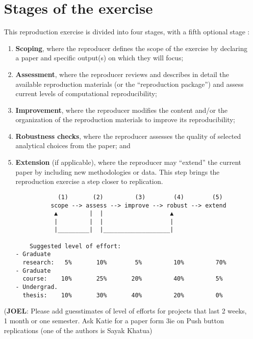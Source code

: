 \documentclass[]{book}
\begin{document}
\hypertarget{stages-of-the-exercise}{%
\section{Stages of the exercise}\label{stages-of-the-exercise}}

This reproduction exercise is divided into four stages, with a fifth optional stage :

\begin{enumerate}
\def\labelenumi{\arabic{enumi}.}
\item
  \textbf{Scoping}, where the reproducer defines the scope of the exercise by declaring a paper and specific output(s) on which they will focus;\\
\item
  \textbf{Assessment}, where the reproducer reviews and describes in detail the available reproduction materials (or the ``reproduction package'') and assess current levels of computational reproducibility;\\
\item
  \textbf{Improvement}, where the reproducer modifies the content and/or the organization of the reproduction materials to improve its reproducibility;\\
\item
  \textbf{Robustness checks}, where the reproducer assesses the quality of selected analytical choices from the paper; and\\
\item
  \textbf{Extension} (if applicable), where the reproducer may ``extend'' the current paper by including new methodologies or data. This step brings the reproduction exercise a step closer to replication.

\begin{verbatim}
            (1)       (2)         (3)        (4)        (5)
          scope --> assess --> improve --> robust --> extend
           ▲         |  |                   ▲
           |         |  |                   |
           |_________|  |___________________|

    Suggested level of effort:
- Graduate
  research:   5%       10%        5%         10%         70%
- Graduate
  course:    10%       25%       20%         40%         5%
- Undergrad.
  thesis:    10%       30%       40%         20%         0%
\end{verbatim}
\end{enumerate}

(\textbf{JOEL}: Please add guesstimates of level of efforts for projects that last 2 weeks, 1 month or one semester. Ask Katie for a paper form 3ie on Push button replications (one of the authors is Sayak Khatua)
\end{document}
